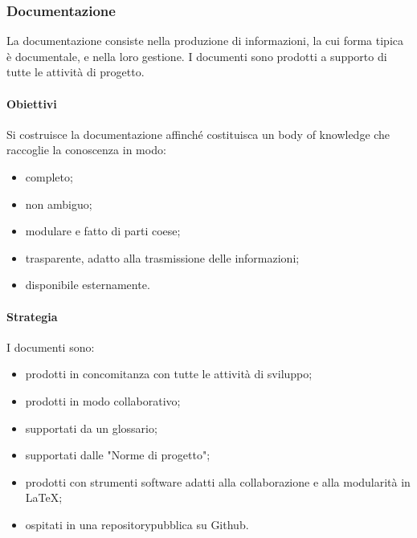 	\subsubsection{Documentazione}
	La documentazione consiste nella produzione di informazioni, la cui forma tipica è  documentale, e nella loro gestione. I documenti sono prodotti a supporto di tutte le attività di progetto.
		\paragraph{Obiettivi}
			Si costruisce la documentazione affinché costituisca un body of knowledge\glosp %
			che raccoglie la conoscenza in modo:
			\begin{itemize}
				\item completo;
				\item non ambiguo;
				\item modulare e fatto di parti coese;
				\item trasparente, adatto alla trasmissione delle informazioni;
				\item disponibile esternamente.
			\end{itemize}
		\paragraph{Strategia}
		I documenti sono:
		\begin{itemize}
			\item prodotti in concomitanza con tutte le attività di sviluppo;
			\item prodotti in modo collaborativo;
			\item supportati da un glossario;
			\item supportati dalle "Norme di progetto";
			\item prodotti con strumenti software adatti alla collaborazione e alla modularità in \LaTeX{};
			\item ospitati in una repository\glosp pubblica su Github.
		\end{itemize}
